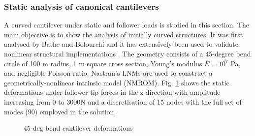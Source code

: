 \documentclass[11pt]{article}
\begin{document}
\subsubsection{Static analysis of canonical cantilevers}
A curved cantilever under static and follower loads is studied in this section. 
The main objective  is to show the analysis of initially curved structures. It was first analysed  by Bathe and Bolourchi \cite{Bathe1979} and it has extensively been used to validate nonlinear structural implementations \cite{Simo1986a,Palacios2010,Werter2016}. The geometry consists of a 45-degree bend circle of 100 m radius, 1 m square cross section, Young's modulus $E = 10^7$ Pa, and negligible Poisson ratio. Nastran's LNMs are used to construct a geometrically-nonlinear intrinsic model (NMROM).  Fig. \ref{fig:simo_shapes} shows the static deformations under follower tip forces in the z-direction with amplitude increasing from 0 to 3000N and a discretisation of 15 nodes with the full set of modes (90) employed in the solution.
\begin{figure}[h!]
 \centering
\caption{45-deg bend cantilever deformations}\label{fig:simo_shapes}
\end{figure}
\end{document}
